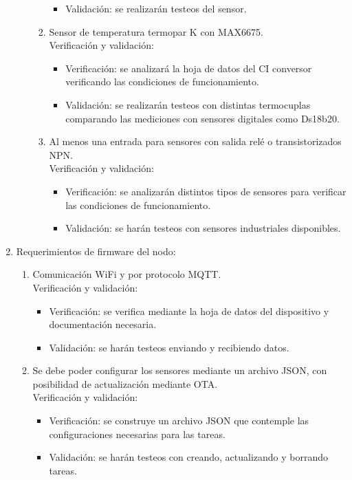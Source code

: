 \documentclass[11pt]{charter}
\begin{document}
\begin{enumerate}
\begin{enumerate}
\begin{enumerate}
\begin{itemize}
			\item Validación: se realizarán testeos del sensor.
			\end{itemize}
		\item Sensor de temperatura termopar K con MAX6675.
			\\Verificación y validación:
			\begin{itemize}
			\item Verificación: se analizará la hoja de datos del CI conversor verificando las condiciones de funcionamiento.
			\item Validación: se realizarán testeos con distintas termocuplas comparando las mediciones con sensores digitales como Ds18b20.
			\end{itemize}
		\item Al menos una entrada para sensores con salida relé o transistorizados NPN.
			\\Verificación y validación:
			\begin{itemize}
			\item Verificación: se analizarán distintos tipos de sensores para verificar las condiciones de funcionamiento.
			\item Validación: se harán testeos con sensores industriales disponibles.
			\end{itemize}
		\end{enumerate}
	\end{enumerate}
\item Requerimientos de firmware del nodo:
	\begin{enumerate}
	\item Comunicación WiFi y por protocolo MQTT.
		\\Verificación y validación:
		\begin{itemize}
		\item Verificación: se verifica mediante la hoja de datos del dispositivo y documentación necesaria.
		\item Validación: se harán testeos enviando y recibiendo datos.
		\end{itemize}
	\item Se debe poder configurar los sensores mediante un archivo JSON, con posibilidad de actualización mediante OTA.
		\\Verificación y validación:
		\begin{itemize}
		\item Verificación: se construye un archivo JSON que contemple las configuraciones necesarias para las tareas.
		\item Validación: se harán testeos con creando, actualizando y borrando tareas.

\end{itemize}
\end{enumerate}
\end{enumerate}
\end{document}
